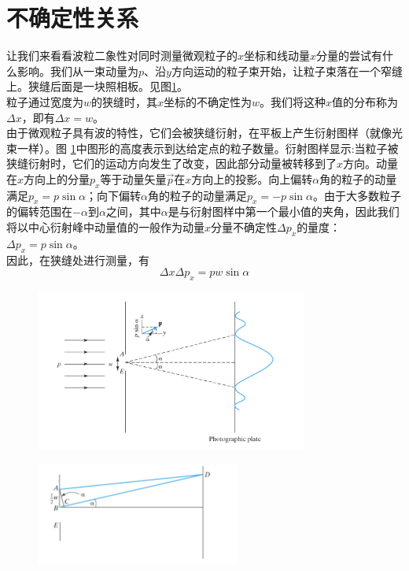 	\section{不确定性关系}
	让我们来看看波粒二象性对同时测量微观粒子的$x$坐标和线动量$x$分量的尝试有什么影响。我们从一束动量为$p$、沿$y$方向运动的粒子束开始，让粒子束落在一个窄缝上。狭缝后面是一块照相板。见图\ref{fig:1.1}。\\
	\indent 粒子通过宽度为$w$的狭缝时，其$x$坐标的不确定性为$w$。我们将这种$x$值的分布称为$\Delta x$，即有$\Delta x = w$。\\
	\indent 由于微观粒子具有波的特性，它们会被狭缝衍射，在平板上产生衍射图样（就像光束一样）。图 \ref{fig:1.1}中图形的高度表示到达给定点的粒子数量。衍射图样显示:当粒子被狭缝衍射时，它们的运动方向发生了改变，因此部分动量被转移到了$x$方向。动量在$x$方向上的分量$p_x$等于动量矢量$\overrightarrow{p}$在$x$方向上的投影。向上偏转$\alpha$角的粒子的动量满足$p_x=p\sin \alpha$；向下偏转$\alpha$角的粒子的动量满足$p_x=-p \sin \alpha$。由于大多数粒子的偏转范围在$-\alpha$到$\alpha$之间，其中$\alpha$是与衍射图样中第一个最小值的夹角，因此我们将以中心衍射峰中动量值的一般作为动量$x$分量不确定性$\Delta p_x$的量度：$\Delta p_x = p \sin \alpha$。\\
	\indent 因此，在狭缝处进行测量，有
	\begin{equation}
		\Delta x \Delta p_x = pw \sin \alpha 
		\label{eq:1.6 diffract equation on x}
	\end{equation}
	
	\begin{figure}[h!]
		\centering
		\includegraphics[width=0.8\textwidth]{Figures/1.1.png}  %
		\caption{}
		\label{fig:1.1}
	\end{figure}
	\begin{figure}[h!]
		\centering
		\includegraphics[width=0.6\textwidth]{Figures/1.2.png}
		\caption{}
		\label{fig:1.2}
	\end{figure}
	
